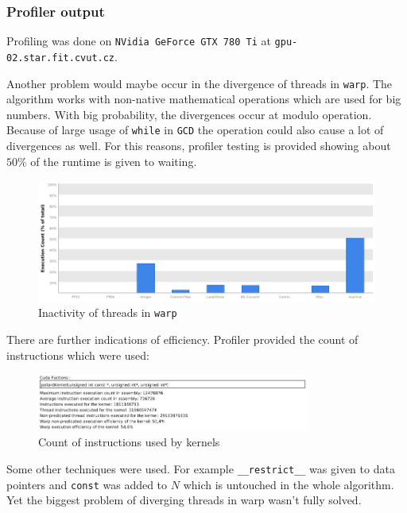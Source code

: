 \documentclass[a4paper]{article}
\begin{document}
\subsubsection{Profiler output}

Profiling was done on \texttt{NVidia GeForce GTX 780 Ti} at \texttt{gpu-02.star.fit.cvut.cz}.

Another problem would maybe occur in the divergence of threads in \texttt{warp}. The algorithm works with non-native mathematical operations which are used for big numbers. With big probability, the divergences occur at modulo operation. Because of large usage of \texttt{while} in \texttt{GCD} the operation could also cause a lot of divergences as well. For this reasons, profiler testing is provided showing about $50\%$ of the runtime is given to waiting.

\begin{figure}[H]
  \centering
    \includegraphics[width=1\textwidth]{inactive.png}
  \caption{Inactivity of threads in \texttt{warp}}
  \label{inactive}
\end{figure}


There are further indications of efficiency. Profiler provided the count of instructions which were used:

\begin{figure}[H]
  \centering
    \includegraphics[width=0.8\textwidth]{insv1.png}
  \caption{Count of instructions used by kernels}
  \label{inactive}
\end{figure}

Some other techniques were used. For example \texttt{\_\_restrict\_\_} was given to data pointers and \texttt{const} was added to $N$ which is untouched in the whole algorithm. Yet the biggest problem of diverging threads in warp wasn't fully solved.
\end{document}
